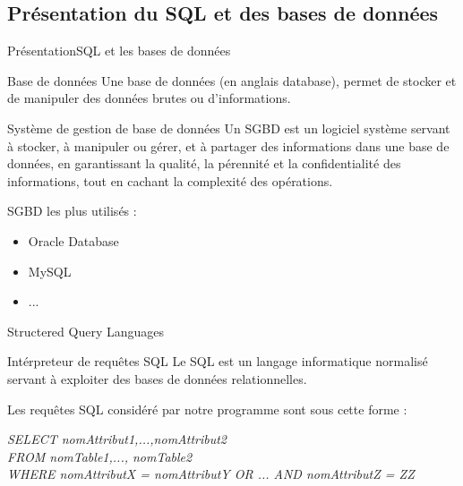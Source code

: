 \documentclass[10pt,handout]{beamer}
\begin{document}
\subsection{Présentation du SQL et des bases de données}
\begin{frame}{Présentation}{SQL et les bases de données}
  \begin{block}{Base de données}
    Une base de données (en anglais database), permet de stocker et de manipuler des données brutes ou d'informations.
  \end{block}

  \begin{block}{Système de gestion de base de données}
    Un SGBD est un logiciel système servant à stocker, à manipuler ou gérer, et à partager des informations dans une base de données, en garantissant la qualité, la pérennité et la confidentialité des informations, tout en cachant la complexité des opérations.
  \end{block}

  SGBD les plus utilisés :
    \begin{itemize}
      \item Oracle Database
      \item MySQL
      \item ...
    \end{itemize}

\end{frame}

\begin{frame}{Structered Query Languages}
  \begin{block}{Intérpreteur de requêtes SQL}
    Le SQL est un langage informatique normalisé servant à exploiter des bases de données relationnelles.
  \end{block}

  Les requêtes SQL considéré par notre programme sont sous cette forme :

  \begin{block}

    \textit{SELECT nomAttribut1,...,nomAttribut2 \\ FROM nomTable1,..., nomTable2 \\ WHERE nomAttributX = nomAttributY OR ... AND nomAttributZ = ZZ}
  \end{block}

\end{frame}

\end{document}
